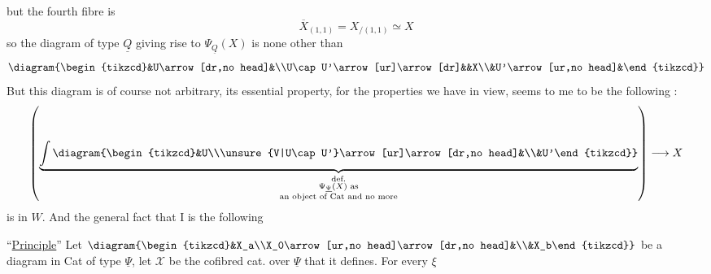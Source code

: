 but the fourth fibre is
\[\overline X_{(1,1)}=X_{/(1,1)}\simeq X\]
so the diagram  of type $\underline Q$ giving rise to $\Psi_{\underline Q}(X)$ is none other than
\[\diagram{\begin{tikzcd}&U\arrow[dr,no head]&\\U\cap U'\arrow[ur]\arrow[dr]&&X\\&U'\arrow[ur,no head]&\end{tikzcd}}\]
But this diagram  is of course not arbitrary, its essential property, for the properties we have in view, seems to me to be the following :
\[\left(\underbrace{\int\diagram{\begin{tikzcd}&U\\\unsure{V|U\cap U'}\arrow[ur]\arrow[dr,no head]&\\&U'\end{tikzcd}}}_{\substack{\text{def.}\\\Psi_{\underline\Psi}(X)\text{ as}\\\text{an object of Cat and no more}}}\right)\longrightarrow X\]
is in $W$. And the general fact that I  is the following

``\uline{Principle}''  Let $\diagram{\begin{tikzcd}&X_a\\X_0\arrow[ur,no head]\arrow[dr,no head]&\\&X_b\end{tikzcd}}$ be a diagram in Cat of type $\underline\Psi$, let $\mathcal X$ be the cofibred cat. over $\underline\Psi$ that it defines. For every $\xi$
